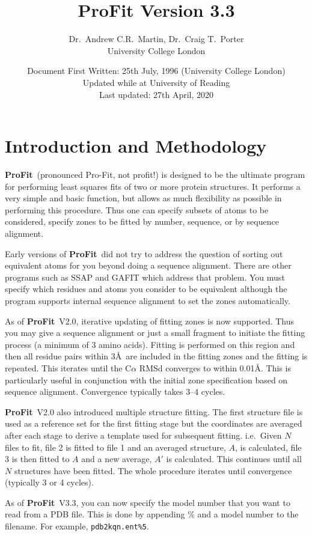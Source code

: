 \documentclass{article}
\title{ProFit Version 3.3}
\author{Dr.\ Andrew C.R.\ Martin, Dr.\ Craig T.\ Porter\\ University College London}
\date{Document First Written: 25th July, 1996 (University College %
London)\\%
Updated while at University of Reading\\%
Last updated: 27th April, 2020}
\newcommand{\pf}{\mbox{\bfseries ProFit}}
\begin{document}
\maketitle

\section{Introduction and Methodology}

\pf\ (pronounced Pro-Fit, not profit!) is designed to be the ultimate
program for performing least squares fits of two or more protein
structures. It performs a very simple and basic function, but allows
as much flexibility as possible in performing this procedure. Thus one
can specify subsets of atoms to be considered, specify zones to be
fitted by number, sequence, or by sequence alignment.

Early versions of \pf\ did not try to address the question of sorting out 
equivalent
atoms for you beyond doing a sequence alignment. There are other
programs such as SSAP and GAFIT which address that problem. You must
specify which residues and atoms you consider to be equivalent
although the program supports internal sequence alignment to set the
zones automatically.

As of \pf\ V2.0, iterative updating of fitting zones is now
supported. Thus you may give a sequence alignment or just a small fragment 
to initiate the
fitting process (a minimum of 3 amino acids). Fitting is performed on
this region and then all residue pairs within 3\AA\ are included in
the fitting zones and the fitting is repeated. This iterates until the
C$\alpha$ RMSd converges to within 0.01\AA. This is particularly
useful in conjunction with the initial zone specification based on
sequence alignment. Convergence typically takes 3--4 cycles.

\pf\ V2.0 also introduced multiple structure fitting. The first
structure file is used as a reference set for the first fitting stage
but the coordinates are averaged after each stage to derive a template
used for subsequent fitting. i.e.\ Given $N$ files to fit, file 2 is
fitted to file 1 and an averaged structure, $A$, is calculated, file 3
is then fitted to $A$ and a new average, $A'$ is calculated. This
continues until all $N$ structures have been fitted. The whole
procedure iterates until convergence (typically 3 or 4 cycles).

As of \pf\ V3.3, you can now specify the model number that you want to
read from a PDB file. This is done by appending \% and a model number
to the filename. For example, {\tt pdb2kqn.ent\%5}.
\end{document}
